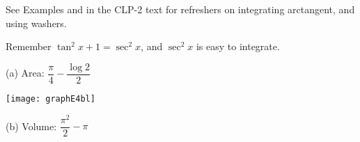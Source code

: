\begin{hint}
See Examples  and   in the
CLP-2 text for refreshers on integrating arctangent, and using washers.

 Remember $\tan^2  x + 1 = \sec^2 x$, and $\sec^2x$ is easy to integrate.
\end{hint}

\begin{answer} (a) Area: $\dfrac{\pi}{4}-\dfrac{\log 2}{2}$
\begin{center}
       \texttt{[image: graphE4bl]}
\end{center}
\noindent (b) Volume: $ \dfrac{\pi^2}{2}-\pi$
\end{answer}

